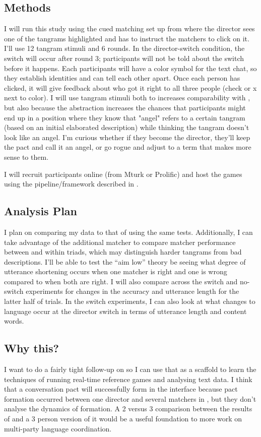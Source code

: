 \documentclass[11pt]{article}
\begin{document}
\subsection{Methods}
I will run this study using the cued matching set up from \cite{hawkinsCharacterizingDynamicsLearning2020} where the director sees one of the tangrams highlighted and has to instruct the matchers to click on it. I'll use 12 tangram stimuli and 6 rounds. In the director-switch condition, the switch will occur after round 3; participants will not be told about the switch before it happens.  Each participants will have a color symbol for the text chat, so they establish identities and can tell each other apart. Once each person has clicked, it will give feedback about who got it right to all three people (check or x next to color). 
I will use tangram stimuli both to increases comparability with \cite{hawkinsCharacterizingDynamicsLearning2020}, but also because the abstraction increases the chances that participants might end up in a position where they know that "angel" refers to a certain tangram (based on an initial elaborated description) while thinking the tangram doesn't look like an angel. I'm curious whether if they become the director, they'll keep the pact and call it an angel, or go rogue and adjust to a term that makes more sense to them. 

I will recruit participants online (from Mturk or Prolific) and host the games using the pipeline/framework described in \cite{hawkinsConductingRealtimeMultiplayer2015}. 
\subsection{Analysis Plan}
I plan on comparing my data to that of \cite{hawkinsCharacterizingDynamicsLearning2020} using the same tests. Additionally, I can take advantage of the additional matcher to compare matcher performance between and within triads, which may distinguish harder tangrams from bad descriptions. I'll be able to test the ``aim low'' theory be seeing what degree of utterance shortening occurs when one matcher is right and one is wrong compared to when both are right. I will also compare across the switch and no-switch experiments for changes in the accuracy and utterance length for the latter half of trials. In the switch experiments, I can also look at what changes to language occur at the director switch in terms of utterance length and content words. 
\subsection{Why this?}
I want to do a fairly tight follow-up on \cite{hawkinsCharacterizingDynamicsLearning2020} so I can use that as a scaffold to learn the techniques of running real-time reference games and analysing text data. I think that a conversation pact will successfully form in the interface because pact formation occurred between one director and several matchers in \cite{yoonAudienceDesignMultiparty2019}, but they don't analyse the dynamics of formation. A 2 versus 3 comparison between the results of \cite{hawkinsCharacterizingDynamicsLearning2020} and a 3 person version of it would be a useful foundation to more work on multi-party language coordination. 
\end{document}
